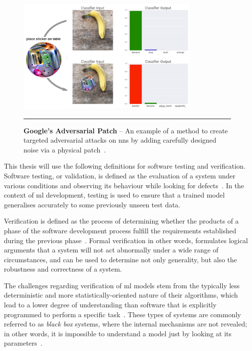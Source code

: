 \begin{figure}[H]
	\centering
        \includegraphics[width=0.8\textwidth]{media/introduction/sticker.png}
        \rule{35em}{0.5pt}
        \caption[Google's Aversarial Patch]{\textbf{Google's Adversarial Patch} -- An example of a method to create targeted adversarial attacks on \glspl{nn} by adding carefully designed noise via a physical patch~\citep{brown2018}.}\label{fig:adversarialpatch}
\end{figure}

This thesis will use the following definitions for software testing and verification.
Software testing, or validation, is defined as the evaluation of a system under various conditions and observing its behaviour while
looking for defects~\citep{pereira}. In the context of \gls{ml} development, testing is used to
ensure that a trained model generalises accurately to some previously unseen test data.

Verification is defined as the process of determining whether the products of a phase of the software development process fulfill
the requirements established during the previous phase~\citep{ammann2008}. Formal verification in other words, formulates logical arguments
that a system will not act abnormally under a wide range of circumstances, and can be used to determine not only generality, but also the robustness and correctness of a system.

The challenges regarding verification of \gls{ml} models stem from the typically less deterministic and more statistically-oriented nature of their algorithms, which
lead to a lower degree of understanding than software that is explicitly programmed to perform a specific task~\citep{bishop}. These types of systems are
commonly referred to as \textit{black box} systems, where the internal mechanisms are not revealed; in other words, it is impossible to understand a model just by
looking at its parameters~\citep{molnar2019}.

